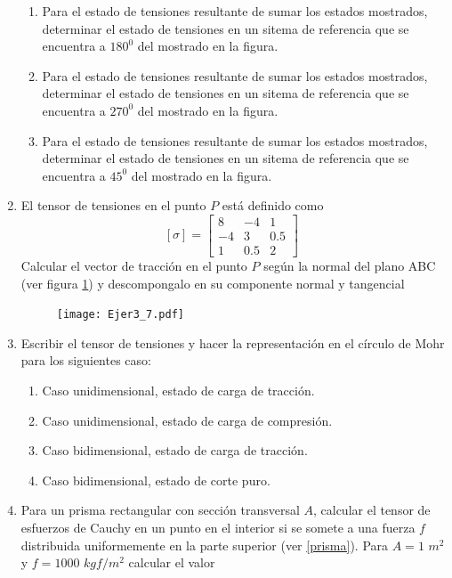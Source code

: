 \documentclass[../notas medios.tex]{subfiles}
\begin{document}
\begin{enumerate}
\begin{enumerate}
	\item Para el estado de tensiones resultante de sumar los estados mostrados,
determinar el estado de tensiones en un sitema de referencia que se encuentra a $180^0$ del mostrado en la figura.
	\item Para el estado de tensiones resultante de sumar los estados mostrados,
determinar el estado de tensiones en un sitema de referencia que se encuentra a $270^0$ del mostrado en la figura.
	\item Para el estado de tensiones resultante de sumar los estados mostrados,
determinar el estado de tensiones en un sitema de referencia que se encuentra a $45^0$ del mostrado en la figura.
\end{enumerate}
%
\item \label{punto07} El tensor de tensiones en el punto $P$ est\'a definido
como
%	
		\[{[\sigma]} = \left[ \begin{array}{ccc}
		8 & -4 & 1 \\ 
		-4 & 3 & 0.5 \\ 
		1 & 0.5 & 2
		\end{array}  \right] \enspace\]
Calcular el vector de tracci\'on en el punto $P$ seg\'un la normal del plano ABC
(ver figura \cref{norplano}) y descompongalo en su componente normal y tangencial
%
\begin{figure}[H]
	\centering
	\texttt{[image: Ejer3\_7.pdf]}
	\caption{}
	\label{norplano}
\end{figure}
\item \label{punto08} Escribir el tensor de tensiones y hacer la
representaci\'on en el c\'irculo de Mohr para los siguientes caso:
%
\begin{enumerate}
	\item Caso unidimensional, estado de carga de tracci\'on.
	\item Caso unidimensional, estado de carga de compresi\'on.
	\item Caso bidimensional, estado de carga de tracci\'on.
	\item Caso bidimensional, estado de corte puro.
\end{enumerate}
\item \label{punto09} Para un prisma rectangular con secci\'on transversal $A$,
calcular el tensor de esfuerzos de Cauchy en un punto en el interior si se somete a una fuerza $f$ distribuida uniformemente en la parte superior (ver \cref{prisma}). 
Para $A=1$ $m^2$ y $f=1000$ $kgf/m^2$ calcular el valor

\end{enumerate}
\end{document}
